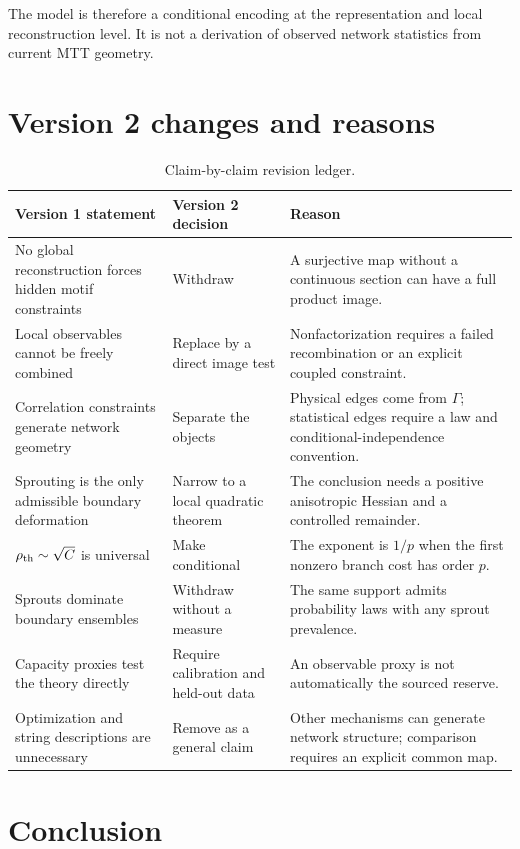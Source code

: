 \documentclass[11pt]{article}
\begin{document}
The model is therefore a conditional encoding at the representation and
local reconstruction level.  It is not a derivation of observed network
statistics from current MTT geometry.

\clearpage
\section{Version 2 changes and reasons}

\begin{table}[ht]
\centering
\small
\begin{tabularx}{\textwidth}{@{}p{}p{}X@{}}
\toprule
Version 1 statement & Version 2 decision & Reason\\
\midrule
No global reconstruction forces hidden motif constraints
& Withdraw
& A surjective map without a continuous section can have a full product
image.\\
Local observables cannot be freely combined
& Replace by a direct image test
& Nonfactorization requires a failed recombination or an explicit coupled
constraint.\\
Correlation constraints generate network geometry
& Separate the objects
& Physical edges come from $\Gamma$; statistical edges require a law and
conditional-independence convention.\\
Sprouting is the only admissible boundary deformation
& Narrow to a local quadratic theorem
& The conclusion needs a positive anisotropic Hessian and a controlled
remainder.\\
$\rho_{\rm th}\sim\sqrt C$ is universal
& Make conditional
& The exponent is $1/p$ when the first nonzero branch cost has order $p$.\\
Sprouts dominate boundary ensembles
& Withdraw without a measure
& The same support admits probability laws with any sprout prevalence.\\
Capacity proxies test the theory directly
& Require calibration and held-out data
& An observable proxy is not automatically the sourced reserve.\\
Optimization and string descriptions are unnecessary
& Remove as a general claim
& Other mechanisms can generate network structure; comparison requires an
explicit common map.\\
\bottomrule
\end{tabularx}
\caption{Claim-by-claim revision ledger.}
\end{table}
\clearpage

\section{Conclusion}
\end{document}
